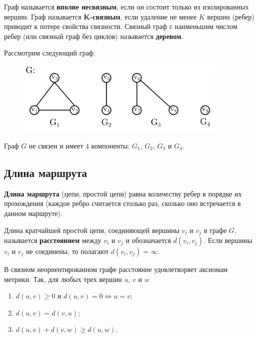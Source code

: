 Граф называется \textbf{вполне несвязным}, если он состоит только из изолированных вершин. Граф называется \(\pmb{K}\)\textbf{-связным}, если удаление не менее \(K\) вершин (ребер) приводит к потере свойства связности. Связный граф с наименьшим числом ребер (или связный граф без циклов) называется \textbf{деревом}.

\begin{example*}
    Рассмотрим следующий граф:
    \begin{figure}[H]
        \centering
        \includegraphics[width=0.9\textwidth]{./images/graph-connectivity.png}
    \end{figure}

    \noindent Граф \(G\) не связен и имеет \(4\) компоненты: \(G_1\), \(G_2\), \(G_3\) и \(G_4\).
\end{example*}

\subsection{Длина маршрута}

\textbf{Длина маршрута} (цепи, простой цепи) равна количеству ребер в порядке их прохождения (каждое ребро считается столько раз, сколько оно встречается в данном маршруте).

Длина кратчайшей простой цепи, соединяющей вершины \(v_i\) и \(v_j\) в графе \(G\), называется \textbf{расстоянием} между \(v_i\) и \(v_j\) и обозначается \(d(v_i, v_j)\). Если вершины \(v_i\) и \(v_j\) не соединены, то полагают \(d(v_i, v_j) = \infty\).

В связном неориентированном графе расстояние удовлетворяет аксиомам метрики. Так, для любых трех вершин \(u\), \(v\) и \(w\)
\begin{enumerate}
    \item \(d(u, v) \geq 0\) и \(d(u, v) = 0 \iff u = v\);
    \item \(d(u, v) = d(v, u)\);
    \item \(d(u, v) + d(v, w) \geq d(u, w)\).
\end{enumerate}

